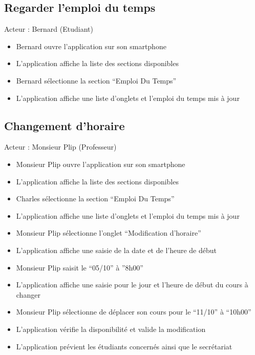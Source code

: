 \subsection*{Regarder l’emploi du temps}
Acteur : Bernard (Etudiant)
\begin{itemize}
\item Bernard ouvre l’application sur son smartphone 
\item L’application affiche la liste des sections disponibles 
\item Bernard sélectionne la section “Emploi Du Temps” 
\item L’application affiche une liste d’onglets et l’emploi du temps mis à jour 
\end{itemize}

\subsection*{Changement d’horaire}
Acteur : Monsieur Plip (Professeur)
\begin{itemize}
\item Monsieur Plip ouvre l’application sur son smartphone 
\item L’application affiche la liste des sections disponibles 
\item Charles sélectionne la section “Emploi Du Temps” 
\item L’application affiche une liste d’onglets et l’emploi du temps mis à jour 
\item Monsieur Plip sélectionne l’onglet “Modification d’horaire” 
\item L’application affiche une saisie de la date et de l’heure de début 
\item Monsieur Plip saisit le “05/10” à ”8h00” 
\item L’application affiche une saisie pour le jour et l’heure de début du cours à changer 
\item Monsieur Plip sélectionne de déplacer son cours pour le “11/10” à “10h00” 
\item L’application vérifie la disponibilité et valide la modification 
\item L’application prévient les étudiants concernés ainsi que le secrétariat 
\end{itemize}

